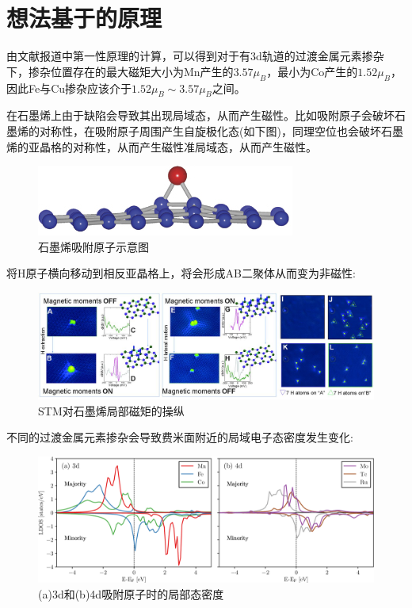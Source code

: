 \documentclass{phyasgn}\usepackage{nag}
\begin{document}
\section{想法基于的原理}
\par 由文献报道中第一性原理的计算\cite{sadki2019spontaneous}，可以得到对于有3d轨道的过渡金属元素掺杂下，掺杂位置存在的最大磁矩大小为Mn产生的$3.57\mu_{B}$，最小为Co产生的$1.52\mu_{B}$，因此Fe与Cu掺杂应该介于$1.52\mu_{B}\sim 3.57\mu_{B}$之间。
\par 在石墨烯上由于缺陷会导致其出现局域态，从而产生磁性。比如吸附原子会破坏石墨烯的对称性，在吸附原子周围产生自旋极化态(如下图)，同理空位也会破坏石墨烯的亚晶格的对称性，从而产生磁性准局域态，从而产生磁性\cite{ray2018electronic}。
\begin{figure}[H]
	\centering
	\hspace{2em}\includegraphics[width=.45\linewidth]{pic/3.jpg}
	\caption{石墨烯吸附原子示意图\cite{ray2018electronic}
	}
\end{figure}
\par 将H原子横向移动到相反亚晶格上，将会形成AB二聚体从而变为非磁性:
\begin{figure}[H]
	\centering
	\hspace{2em}\includegraphics[width=.8\linewidth]{pic/1.jpeg}
	\caption{STM对石墨烯局部磁矩的操纵\cite{gonzalez2016atomic}
	}
\end{figure}
\par 不同的过渡金属元素掺杂会导致费米面附近的局域电子态密度发生变化:
\begin{figure}[H]
	\centering
	\hspace{2em}\includegraphics[width=.75\linewidth]{pic/2.png}
	\caption{(a)3d和(b)4d吸附原子时的局部态密度\cite{sadki2019spontaneous}
	}
\end{figure}
\end{document}
